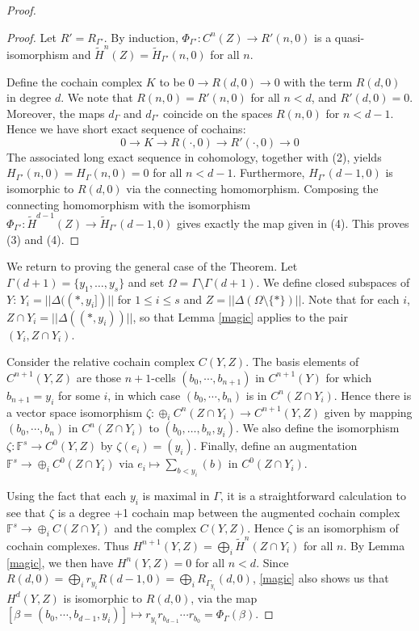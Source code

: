 \documentclass[11pt,righttag]{amsart}
\theoremstyle{definition}
\begin{document}
\begin{proof}
\begin{proof}
Let $R' = R_{\Gamma'}$.  By induction, $\Phi_{\Gamma'}:C^n(Z) \to R'(n,0)$ is a quasi-isomorphism and $\tilde H^n(Z) = \tilde H_{\Gamma'}(n,0)$ for all $n$.  

Define the cochain complex $K$ to be $0\to R(d,0) \to 0$ with the term $R(d,0)$ in degree $d$. We note that $R(n,0) = R'(n,0)$ for all $n<d$, and $R'(d,0)=0$.  Moreover, the maps $d_\Gamma$ and $d_{\Gamma'}$ coincide on the spaces $R(n,0)$ for $n<d-1$. Hence we have short exact sequence of cochains:
$$ 0 \to K \to R(\cdot,0) \to R'(\cdot,0) \to 0$$
The associated long exact sequence in cohomology, together with (2),  yields $H_{\Gamma'}(n,0) =H_{\Gamma}(n,0)= 0$ for all $n<d-1$. Furthermore,  $ H_{\Gamma'}(d-1,0)$ is isomorphic to $R(d,0)$ via the connecting homomorphism.  Composing the connecting homomorphism with the isomorphism $\Phi_{\Gamma'}:\tilde H^{d-1}(Z) \to \tilde H_{\Gamma'}(d-1,0)$ gives exactly the map given in (4).  This proves (3) and (4).
\end{proof}

We return to proving the general case of the Theorem.   Let $\Gamma(d+1) = \{y_1,\ldots,y_s\}$ and set $\Omega = \Gamma \setminus \Gamma(d+1)$.  We define closed subspaces of $Y$:  $Y_i = ||\Delta((*,y_i])||$ for $1\le i\le s$ and 
$Z =||\Delta(\Omega\setminus\{*\})||$.  Note that for each $i$,  $Z\cap Y_i = ||\Delta((*,y_i))||$, so that Lemma \ref{magic} applies to the pair $(Y_i,Z\cap Y_i)$.   

Consider the relative cochain complex $C(Y,Z)$.  The basis elements of $C^{n+1}(Y,Z)$ are those 
$n+1$-cells $(b_0,\cdots,b_{n+1})$ in $C^{n+1}(Y)$ for which $b_{n+1} = y_i$ for some $i$, in 
which case $(b_0,\cdots,b_n)$ is in $C^n(Z\cap Y_i)$.  Hence there is a vector space isomorphism 
$\zeta: \oplus_i C^n(Z\cap Y_i) \to C^{n+1}(Y,Z)$ given by mapping $(b_0,\cdots,b_n)$ in 
$C^n(Z\cap Y_i)$ to $(b_0,\ldots,b_n,y_i)$.  We also define the isomorphism 
$\zeta: {{\mathbb F}}^s \to C^0(Y,Z)$ by $\zeta(e_i) = (y_i)$.  Finally, define an augmentation 
${{\mathbb F}}^s \to \oplus_iC^0(Z\cap Y_i)$ via $e_i \mapsto \sum\limits_{b<y_i} (b)$ in $C^0(Z\cap Y_i)$.  

Using the fact that each $y_i$ is maximal in $\Gamma$, it is a straightforward calculation to see that $\zeta$ is a degree +1 cochain map between the augmented cochain complex ${{\mathbb F}}^s \to \oplus_i C(Z\cap Y_i)$ and the complex $C(Y,Z)$.  Hence $\zeta$ is an isomorphism of cochain complexes.  Thus 
$H^{n+1}(Y,Z) = \bigoplus_i \tilde H^n(Z\cap Y_i)$ for all $n$. By Lemma \ref{magic}, we then 
have $H^n(Y,Z) = 0$ for all $n<d$.  Since $R(d,0) = \bigoplus_i r_{y_i}R(d-1,0) = \bigoplus_i R_{\Gamma_{y_i}} (d,0)$, \ref{magic} also shows us that $H^d(Y,Z)$ is isomorphic to $R(d,0)$, via the map $[\beta=(b_0,\cdots,b_{d-1},y_i)] \mapsto r_{y_i}r_{b_{d-1}}\cdots r_{b_0} = \Phi_\Gamma(\beta)$.  


\end{proof}
\end{document}
